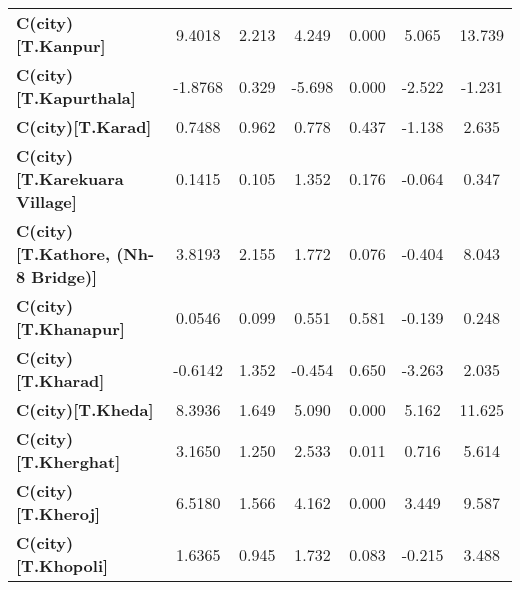 \begin{center}
\begin{tabular}{lcccccc}
\textbf{C(city)[T.Kanpur]}                                                                          &       9.4018  &        2.213     &     4.249  &         0.000        &        5.065    &       13.739     \\
\textbf{C(city)[T.Kapurthala]}                                                                      &      -1.8768  &        0.329     &    -5.698  &         0.000        &       -2.522    &       -1.231     \\
\textbf{C(city)[T.Karad]}                                                                           &       0.7488  &        0.962     &     0.778  &         0.437        &       -1.138    &        2.635     \\
\textbf{C(city)[T.Karekuara Village]}                                                               &       0.1415  &        0.105     &     1.352  &         0.176        &       -0.064    &        0.347     \\
\textbf{C(city)[T.Kathore, (Nh-8 Bridge)]}                                                          &       3.8193  &        2.155     &     1.772  &         0.076        &       -0.404    &        8.043     \\
\textbf{C(city)[T.Khanapur]}                                                                        &       0.0546  &        0.099     &     0.551  &         0.581        &       -0.139    &        0.248     \\
\textbf{C(city)[T.Kharad]}                                                                          &      -0.6142  &        1.352     &    -0.454  &         0.650        &       -3.263    &        2.035     \\
\textbf{C(city)[T.Kheda]}                                                                           &       8.3936  &        1.649     &     5.090  &         0.000        &        5.162    &       11.625     \\
\textbf{C(city)[T.Kherghat]}                                                                        &       3.1650  &        1.250     &     2.533  &         0.011        &        0.716    &        5.614     \\
\textbf{C(city)[T.Kheroj]}                                                                          &       6.5180  &        1.566     &     4.162  &         0.000        &        3.449    &        9.587     \\
\textbf{C(city)[T.Khopoli]}                                                                         &       1.6365  &        0.945     &     1.732  &         0.083        &       -0.215    &        3.488     \\

\end{tabular}
\end{center}
